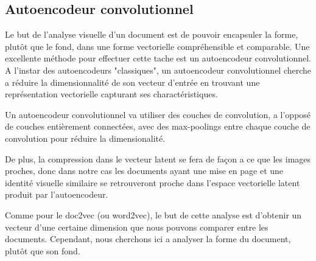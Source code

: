 \subsection{Autoencodeur convolutionnel}

Le but de l'analyse visuelle d'un document est de pouvoir encapsuler la forme, plutôt que le fond, dans une forme vectorielle compréhensible et comparable. Une excellente méthode pour effectuer cette tache est un autoencodeur convolutionnel. A l'instar des autoencodeurs "classiques", un autoencodeur convolutionnel cherche a réduire la dimensionnalité de son vecteur d'entrée en trouvant une représentation vectorielle capturant ses charactéristiques. 

Un autoencodeur convolutionnel va utiliser des couches de convolution, a l'opposé de couches entièrement connectées, avec des max-poolings entre chaque couche de convolution pour réduire la dimensionalité. 

De plus, la compression dans le vecteur latent se fera de façon a ce que les images proches, donc dans notre cas les documents ayant une mise en page et une identité visuelle similaire se retrouveront proche dans l'espace vectorielle latent produit par l'autoencodeur.

Comme pour le doc2vec (ou word2vec), le but de cette analyse est d'obtenir un vecteur d'une certaine dimension que nous pouvons comparer entre les documents. Cependant, nous cherchons ici a analyser la forme du document, plutôt que son fond. 
